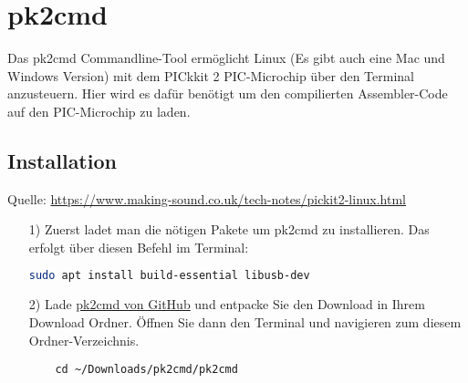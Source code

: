 \section{pk2cmd}
\label{sec:pk2cmd}
Das {\ttfamily pk2cmd} Commandline-Tool ermöglicht Linux (Es gibt auch eine Mac und Windows Version) mit dem PICkkit 2 PIC-Microchip über den Terminal anzusteuern. Hier wird es dafür benötigt um den compilierten Assembler-Code auf den PIC-Microchip zu laden.

\subsection{Installation}
\label{sub:installation}
Quelle: \url{https://www.making-sound.co.uk/tech-notes/pickit2-linux.html}\\

\begin{itemize}
    \item[1)] Zuerst ladet man die nötigen Pakete um {\ttfamily pk2cmd} zu installieren. Das erfolgt über diesen Befehl im Terminal:
    \begin{lstlisting}[language=bash]
    sudo apt install build-essential libusb-dev
    \end{lstlisting}
    \item[2)] Lade \href{https://github.com/psmay/pk2cmd}{pk2cmd von GitHub} und entpacke Sie den Download in Ihrem Download Ordner. Öffnen Sie dann den Terminal und navigieren zum diesem Ordner-Verzeichnis.
    \begin{lstlisting}
    cd ~/Downloads/pk2cmd/pk2cmd
    \end{lstlisting}
    

\end{itemize}
